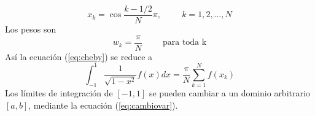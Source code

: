 \documentclass[12pt]{article}
\begin{document}
\begin{equation}
x_{k} = \cos \dfrac{k-1/2}{N} \pi, \hspace{1cm} k=1,2,\ldots,N
\end{equation}
Los pesos son
\begin{equation}
w_{k} = \dfrac{\pi}{N} \hspace{1cm} \text{para toda k}
\end{equation}
Así la ecuación (\ref{eq:cheby}) se reduce a
\begin{equation}
\int_{-1}^{1} \dfrac{1}{\sqrt{1-x^{2}}} f(x) dx = \dfrac{\pi}{N} \sum_{k=1}^{N} f(x_{k})
\end{equation}
Los límites de integración de $[-1,1]$ se pueden cambiar a un dominio arbitrario $[a,b]$, mediante la ecuación (\ref{eq:cambiovar}).
\end{document}
